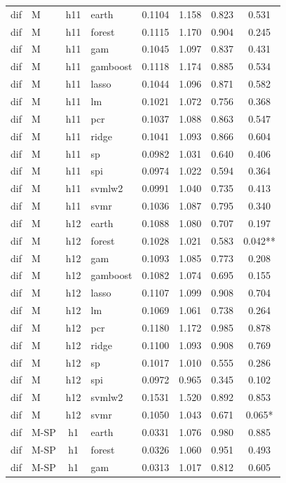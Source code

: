 \begin{ThreePartTable}
\begin{longtable}[t]{llclcccc}
\addlinespace
dif & M & h11 & earth & 0.1104 & 1.158 & 0.823 & 0.531\\
dif & M & h11 & forest & 0.1115 & 1.170 & 0.904 & 0.245\\
dif & M & h11 & gam & 0.1045 & 1.097 & 0.837 & 0.431\\
dif & M & h11 & gamboost & 0.1118 & 1.174 & 0.885 & 0.534\\
dif & M & h11 & lasso & 0.1044 & 1.096 & 0.871 & 0.582\\
dif & M & h11 & lm & 0.1021 & 1.072 & 0.756 & 0.368\\
dif & M & h11 & pcr & 0.1037 & 1.088 & 0.863 & 0.547\\
dif & M & h11 & ridge & 0.1041 & 1.093 & 0.866 & 0.604\\
dif & M & h11 & sp & 0.0982 & 1.031 & 0.640 & 0.406\\
dif & M & h11 & spi & 0.0974 & 1.022 & 0.594 & 0.364\\
dif & M & h11 & svmlw2 & 0.0991 & 1.040 & 0.735 & 0.413\\
dif & M & h11 & svmr & 0.1036 & 1.087 & 0.795 & 0.340\\
\addlinespace
dif & M & h12 & earth & 0.1088 & 1.080 & 0.707 & 0.197\\
dif & M & h12 & forest & 0.1028 & 1.021 & 0.583 & 0.042**\\
dif & M & h12 & gam & 0.1093 & 1.085 & 0.773 & 0.208\\
dif & M & h12 & gamboost & 0.1082 & 1.074 & 0.695 & 0.155\\
dif & M & h12 & lasso & 0.1107 & 1.099 & 0.908 & 0.704\\
dif & M & h12 & lm & 0.1069 & 1.061 & 0.738 & 0.264\\
dif & M & h12 & pcr & 0.1180 & 1.172 & 0.985 & 0.878\\
dif & M & h12 & ridge & 0.1100 & 1.093 & 0.908 & 0.769\\
dif & M & h12 & sp & 0.1017 & 1.010 & 0.555 & 0.286\\
dif & M & h12 & spi & 0.0972 & 0.965 & 0.345 & 0.102\\
dif & M & h12 & svmlw2 & 0.1531 & 1.520 & 0.892 & 0.853\\
dif & M & h12 & svmr & 0.1050 & 1.043 & 0.671 & 0.065*\\
\addlinespace
dif & M-SP & h1 & earth & 0.0331 & 1.076 & 0.980 & 0.885\\
dif & M-SP & h1 & forest & 0.0326 & 1.060 & 0.951 & 0.493\\
dif & M-SP & h1 & gam & 0.0313 & 1.017 & 0.812 & 0.605\\

\end{longtable}
\end{ThreePartTable}
